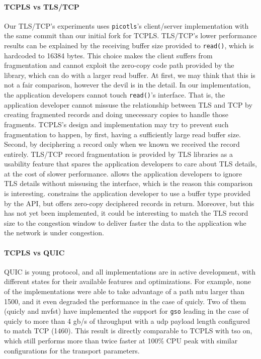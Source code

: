 \paragraph*{TCPLS vs TLS/TCP}
Our TLS/TCP's experiments uses \texttt{picotls}'s client/server implementation with
the same commit than our initial fork for TCPLS. TLS/TCP's lower performance results
can be explained by the receiving buffer size provided to \texttt{read()}, which
is hardcoded to 16384 bytes. This choice makes the client suffers from
fragmentation and cannot exploit the zero-copy code path provided by the
library, which \tcpls can do with a larger read buffer. At first, we may think
that this is not a fair comparison, however the devil is in the detail. In our
implementation, the application developers cannot touch \texttt{read()}'s
interface. That is, the application developer cannot missuse the relationship
between TLS and TCP by creating fragmented records and doing unecessary copies
to handle those fragments. TCPLS's design and implementation may try to prevent
such fragmentation to happen, by first, having a sufficiently large read buffer
size. Second, by deciphering a record only when we known we received the record
entirely. TLS/TCP record fragmentation is provided by TLS libraries as a
usability feature that spares the application developers to care about TLS
details, at the cost of slower performance. \tcpls allows the application
developers to ignore TLS details without missusing the interface,
which is the reason this comparison is interesting. \tcpls constrains the
application developer to use a buffer type provided by the API, but offers
zero-copy deciphered records in return. Moreover, but this has not
yet been implemented, it could be interesting to match the TLS record size to
the congestion window to deliver faster the data to the application whe the
network is under congestion.
\paragraph{TCPLS vs QUIC}
QUIC is young protocol, and all implementations are in active development, with
different states for their available features and optimizations. For example,
none of the implementations were able to take advantage of a path mtu larger
than 1500, and it even degraded the performance in the case of quicly. Two of them
(quicly and mvfst) have implemented the support for \texttt{gso} leading in the
case of quicly to more than 4 gb/s of throughput with a udp payload length
configured to match TCP (1460). This result is directly comparable to TCPLS with
tso on, which still performs more than twice faster at 100\% CPU peak with
similar configurations for the transport parameters.


